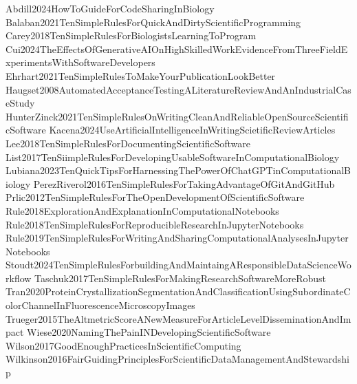 \tiem Abdill2024HowToGuideForCodeSharingInBiology
\tiem Balaban2021TenSimpleRulesForQuickAndDirtyScientificProgramming
\tiem Carey2018TenSimpleRulesForBiologistsLearningToProgram
\tiem Cui2024TheEffectsOfGenerativeAIOnHighSkilledWorkEvidenceFromThreeFieldExperimentsWithSoftwareDevelopers
\tiem Ehrhart2021TenSimpleRulesToMakeYourPublicationLookBetter
\tiem Haugset2008AutomatedAcceptanceTestingALiteratureReviewAndAnIndustrialCaseStudy
\tiem HunterZinck2021TenSimpleRulesOnWritingCleanAndReliableOpenSourceScientificSoftware
\tiem Kacena2024UseArtificialIntelligenceInWritingScietificReviewArticles
\tiem Lee2018TenSimpleRulesForDocumentingScientificSoftware
\tiem List2017TenSiimpleRulesForDevelopingUsableSoftwareInComputationalBiology
\tiem Lubiana2023TenQuickTipsForHarnessingThePowerOfChatGPTinComputationalBiology
\tiem PerezRiverol2016TenSimpleRulesForTakingAdvantageOfGitAndGitHub
\tiem Prlic2012TenSimpleRulesForTheOpenDevelopmentOfScientificSoftware
\tiem Rule2018ExplorationAndExplanationInComputationalNotebooks
\tiem Rule2018TenSimpleRulesForReproducibleResearchInJupyterNotebooks
\tiem Rule2019TenSimpleRulesForWritingAndSharingComputationalAnalysesInJupyterNotebooks
\tiem Stoudt2024TenSimpleRulesForbuildingAndMaintaingAResponsibleDataScienceWorkflow
\tiem Taschuk2017TenSimpleRulesForMakingResearchSoftwareMoreRobust
\tiem Tran2020ProteinCrystallizationSegmentationAndClassificationUsingSubordinateColorChannelInFluorescenceMicroscopyImages
\tiem Trueger2015TheAltmetricScoreANewMeasureForArticleLevelDisseminationAndImpact
\tiem Wiese2020NamingThePainINDevelopingScientificSoftware
\tiem Wilson2017GoodEnoughPracticesInScientificComputing
\tiem Wilkinson2016FairGuidingPrinciplesForScientificDataManagementAndStewardship
